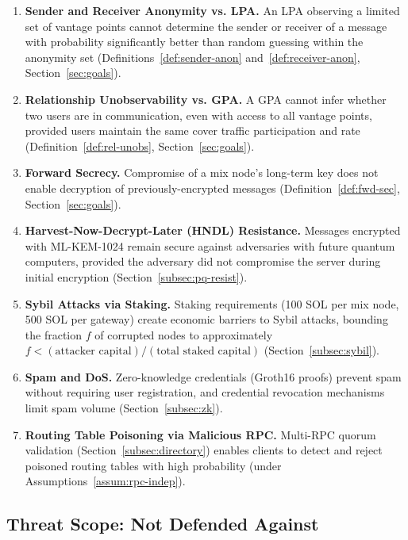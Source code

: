 \documentclass[11pt]{article}
\theoremstyle{definition}
\theoremstyle{remark}
\begin{document}
\begin{enumerate}
    \item \textbf{Sender and Receiver Anonymity vs. LPA.} An LPA observing a limited set of vantage points cannot determine the sender or receiver of a message with probability significantly better than random guessing within the anonymity set (Definitions~\ref{def:sender-anon} and~\ref{def:receiver-anon}, Section~\ref{sec:goals}).

    \item \textbf{Relationship Unobservability vs. GPA.} A GPA cannot infer whether two users are in communication, even with access to all vantage points, provided users maintain the same cover traffic participation and rate (Definition~\ref{def:rel-unobs}, Section~\ref{sec:goals}).

    \item \textbf{Forward Secrecy.} Compromise of a mix node's long-term key does not enable decryption of previously-encrypted messages (Definition~\ref{def:fwd-sec}, Section~\ref{sec:goals}).

    \item \textbf{Harvest-Now-Decrypt-Later (HNDL) Resistance.} Messages encrypted with ML-KEM-1024 remain secure against adversaries with future quantum computers, provided the adversary did not compromise the server during initial encryption (Section~\ref{subsec:pq-resist}).

    \item \textbf{Sybil Attacks via Staking.} Staking requirements (100 SOL per mix node, 500 SOL per gateway) create economic barriers to Sybil attacks, bounding the fraction $f$ of corrupted nodes to approximately $f < (\text{attacker capital}) / (\text{total staked capital})$ (Section~\ref{subsec:sybil}).

    \item \textbf{Spam and DoS.} Zero-knowledge credentials (Groth16 proofs) prevent spam without requiring user registration, and credential revocation mechanisms limit spam volume (Section~\ref{subsec:zk}).

    \item \textbf{Routing Table Poisoning via Malicious RPC.} Multi-RPC quorum validation (Section~\ref{subsec:directory}) enables clients to detect and reject poisoned routing tables with high probability (under Assumptions~\ref{assum:rpc-indep}).
\end{enumerate}

\subsection{Threat Scope: Not Defended Against}
\end{document}
